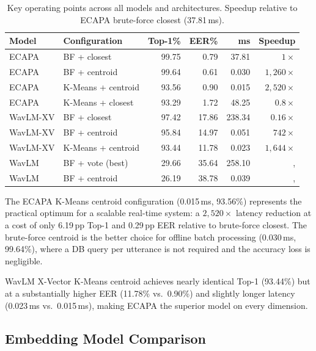 \documentclass[12pt, a4paper]{article}
\begin{document}
\begin{table}[H]
\centering
\caption{Key operating points across all models and architectures.
  Speedup relative to ECAPA brute-force closest (37.81\,ms).}
\label{tab:tradeoff}
\setlength{\tabcolsep}{4pt}
\begin{tabular}{llrrrr}
\toprule
\textbf{Model} & \textbf{Configuration} &
\textbf{Top-1\%} & \textbf{EER\%} &
\textbf{ms} & \textbf{Speedup} \\
\midrule
ECAPA    & BF + closest           & 99.75 & 0.79  & 37.81  & $1{\times}$       \\
ECAPA    & BF + centroid          & 99.64 & 0.61  & 0.030  & $1{,}260{\times}$ \\
ECAPA    & K-Means + centroid     & 93.56 & 0.90  & 0.015  & $2{,}520{\times}$ \\
ECAPA    & K-Means + closest      & 93.29 & 1.72  & 48.25  & $0.8{\times}$     \\
\midrule
WavLM-XV & BF + closest           & 97.42 & 17.86 & 238.34 & $0.16{\times}$    \\
WavLM-XV & BF + centroid          & 95.84 & 14.97 & 0.051  & $742{\times}$     \\
WavLM-XV & K-Means + centroid     & 93.44 & 11.78 & 0.023  & $1{,}644{\times}$ \\
\midrule
WavLM    & BF + vote (best)       & 29.66 & 35.64 & 258.10 &,               \\
WavLM    & BF + centroid          & 26.19 & 38.78 & 0.039  &,               \\
\bottomrule
\end{tabular}
\end{table}

The ECAPA K-Means centroid configuration (0.015\,ms, 93.56\%)
represents the practical optimum for a scalable real-time system:
a $2{,}520{\times}$ latency reduction at a cost of only 6.19\,pp
Top-1 and 0.29\,pp EER relative to brute-force closest.
The brute-force centroid is the better choice for offline batch
processing (0.030\,ms, 99.64\%), where a DB query per utterance is
not required and the accuracy loss is negligible.

WavLM X-Vector K-Means centroid achieves nearly identical Top-1
(93.44\%) but at a substantially higher EER (11.78\% vs.\ 0.90\%)
and slightly longer latency (0.023\,ms vs.\ 0.015\,ms), making
ECAPA the superior model on every dimension.

\subsection{Embedding Model Comparison}
\label{sec:analysis_model}
\end{document}
